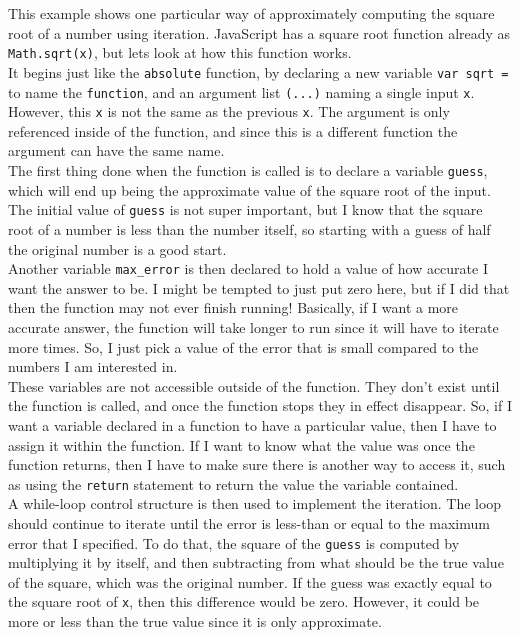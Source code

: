 
This example shows one particular way of approximately computing the square root of a number using iteration. JavaScript has a square root function already as \texttt{Math.sqrt(x)}, but lets look at how this function works.\\

It begins just like the \texttt{absolute} function, by declaring a new variable \texttt{var sqrt = } to name the \texttt{function}, and an argument list \texttt{(...)} naming a single input \texttt{x}. However, this \texttt{x} is not the same as the previous \texttt{x}. The argument is only referenced inside of the function, and since this is a different function the argument can have the same name.\\

The first thing done when the function is called is to declare a variable \texttt{guess}, which will end up being the approximate value of the square root of the input. The initial value of \texttt{guess} is not super important, but I know that the square root of a number is less than the number itself, so starting with a guess of half the original number is a good start.\\

Another variable \texttt{max\_error} is then declared to hold a value of how accurate I want the answer to be. I might be tempted to just put zero here, but if I did that then the function may not ever finish running! Basically, if I want a more accurate answer, the function will take longer to run since it will have to iterate more times. So, I just pick a value of the error that is small compared to the numbers I am interested in.\\

These variables are not accessible outside of the function. They don't exist until the function is called, and once the function stops they in effect disappear. So, if I want a variable declared in a function to have a particular value, then I have to assign it within the function. If I want to know what the value was once the function returns, then I have to make sure there is another way to access it, such as using the \texttt{return} statement to return the value the variable contained.\\

A while-loop control structure is then used to implement the iteration. The loop should continue to iterate until the error is less-than or equal to the maximum error that I specified. To do that, the square of the \texttt{guess} is computed by multiplying it by itself, and then subtracting from what should be the true value of the square, which was the original number. If the guess was exactly equal to the square root of \texttt{x}, then this difference would be zero. However, it could be more or less than the true value since it is only approximate.\\

